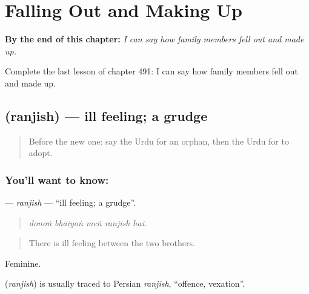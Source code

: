 
\chapter{Falling Out and Making Up}
\label{ch:ur-falling-out-and-making-up}

\begin{chapteropening}
\textbf{By the end of this chapter:} \emph{I can say how family members fell out and made up.}

Complete the last lesson of chapter 491: I can say how family members fell out and made up.
\end{chapteropening}

\section[\texorpdfstring{\ur{رنجش} (ranjish)}{رنجش (ranjish)}]{ (ranjish) — ill feeling; a grudge}

\label{lesson:UR-C491-ranjish}



\begin{quote}
Before the new one: say the Urdu for an orphan, then the Urdu for to adopt.
\end{quote}

\subsection*{You'll want to know: }
\textbf{} — \emph{ranjish} — \textquotedblleft{}ill feeling; a grudge\textquotedblright{}.

\begin{quote}
    
\end{quote}

\begin{quote}
\emph{donoṅ bhāiyoṅ meṅ ranjish hai.}
\end{quote}

\begin{quote}
There is ill feeling between the two brothers.
\end{quote}

Feminine.

\begin{cousinweb}
\textbf{} (\emph{ranjish}) is usually traced to Persian \emph{ranjish}, \textquotedblleft{}offence, vexation\textquotedblright{}.
\end{cousinweb}

